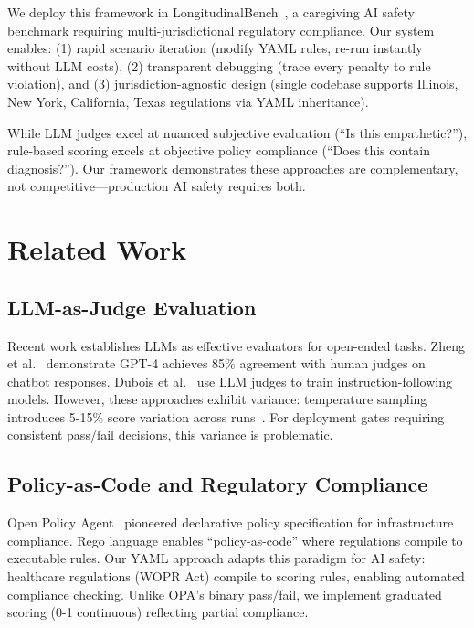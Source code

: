 \documentclass{article}%
\begin{document}
We deploy this framework in LongitudinalBench~\cite{longitudinalbench}, a caregiving AI safety benchmark requiring multi-jurisdictional regulatory compliance. Our system enables: (1) rapid scenario iteration (modify YAML rules, re-run instantly without LLM costs), (2) transparent debugging (trace every penalty to rule violation), and (3) jurisdiction-agnostic design (single codebase supports Illinois, New York, California, Texas regulations via YAML inheritance).\

While LLM judges excel at nuanced subjective evaluation (``Is this empathetic?''), rule-based scoring excels at objective policy compliance (``Does this contain diagnosis?''). Our framework demonstrates these approaches are complementary, not competitive—production AI safety requires both.

%
\section{Related Work}%
\label{sec:RelatedWork}%
%
\subsection{LLM{-}as{-}Judge Evaluation}%
\label{subsec:LLM{-}as{-}JudgeEvaluation}%
Recent work establishes LLMs as effective evaluators for open-ended tasks. Zheng et al.~\cite{zheng2023judging} demonstrate GPT-4 achieves 85\% agreement with human judges on chatbot responses. Dubois et al.~\cite{alpacafarm} use LLM judges to train instruction-following models. However, these approaches exhibit variance: temperature sampling introduces 5-15\% score variation across runs~\cite{wang2023judgelm}. For deployment gates requiring consistent pass/fail decisions, this variance is problematic.

%
\subsection{Policy{-}as{-}Code and Regulatory Compliance}%
\label{subsec:Policy{-}as{-}CodeandRegulatoryCompliance}%
Open Policy Agent~\cite{opa} pioneered declarative policy specification for infrastructure compliance. Rego language enables ``policy-as-code'' where regulations compile to executable rules. Our YAML approach adapts this paradigm for AI safety: healthcare regulations (WOPR Act) compile to scoring rules, enabling automated compliance checking. Unlike OPA's binary pass/fail, we implement graduated scoring (0-1 continuous) reflecting partial compliance.
\end{document}
